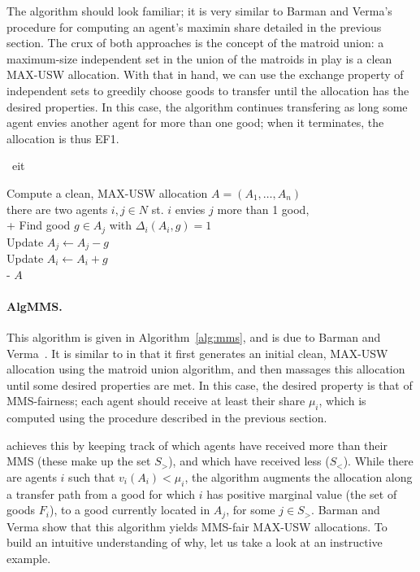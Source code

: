 The algorithm should look familiar; it is very similar to Barman and Verma's procedure for computing an agent's maximin share detailed in the previous section. The crux of both approaches is the concept of the matroid union: a maximum-size independent set in the union of the matroids in play is a clean MAX-USW allocation. With that in hand, we can use the exchange property of independent sets to greedily choose goods to transfer until the allocation has the desired properties. In this case, the algorithm continues transfering as long some agent envies another agent for more than one good; when it terminates, the allocation is thus EF1.

\begin{algorithm}{~\cite{benabbou-2021}}{eit}

\begin{pseudo}[label=\small\arabic*, indent-mark]
    Compute a clean, MAX-USW allocation $A = (A_1,\dots,A_n)$ \\
     there are two agents $i,j\in N$ st. $i$ envies $j$ more than 1 good,   \\+
        Find good $g \in A_j$ with $\Delta_i(A_i, g) = 1$ \\
        Update $A_j \leftarrow A_j - g$ \\
        Update $A_i \leftarrow A_i + g$ \\-
     $A$
\end{pseudo}
  
  \end{algorithm}


\paragraph{AlgMMS.} This algorithm is given in Algorithm~\ref{alg:mms}, and is due to Barman and Verma~\cite{barman2021existence}. It is similar to  in that it first generates an initial clean, MAX-USW allocation using the matroid union algorithm, and then massages this allocation until some desired properties are met. In this case, the desired property is that of MMS-fairness; each agent should receive at least their share $\mu_i$, which is computed using the procedure described in the previous section.

 achieves this by keeping track of which agents have received more than their MMS (these make up the set $S_>$), and which have received less ($S_<$). While there are agents $i$ such that $v_i(A_i) < \mu_i$, the algorithm augments the allocation along a transfer path from a good for which $i$ has positive marginal value (the set of goods $F_i$), to a good currently located in $A_j$, for some $j\in S_>$. Barman and Verma show that this algorithm yields MMS-fair MAX-USW allocations. To build an intuitive understanding of why, let us take a look at an instructive example.

